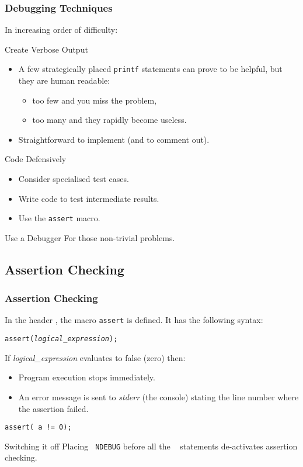 \documentclass[smaller,table]{beamer} %
\begin{document}
\begin{frame}
\frametitle{Debugging Techniques}
\begin{small}
In increasing order of difficulty:
\begin{block}{Create Verbose Output}
\begin{itemize}
\item A few strategically placed {\tt printf} statements can prove to be helpful, but they are human readable:
\begin{itemize}
\item too few and you miss the problem,
\item too many and they rapidly become useless.
\end{itemize}
\item Straightforward to implement (and to comment out).
\end{itemize}
\end{block}

\begin{block}{Code Defensively}
\begin{itemize}
\item Consider specialised test cases.
\item Write code to test intermediate results.
\item Use the {\tt assert} macro.
\end{itemize}
\end{block}

\begin{block}{Use a Debugger}
For those non-trivial problems.
\end{block}
\end{small}
\end{frame}

\subsection{Assertion Checking}
\begin{frame}
\frametitle{Assertion Checking}
In the header , the macro {\tt assert} is defined. It has the following syntax:\\
\begin{center}
\tt assert(\emph{logical\_expression});
\end{center}
If \emph{logical\_expression} evaluates to false (zero) then:
\begin{itemize}
\item Program execution stops immediately.
\item An error message is sent to \emph{stderr} (the console) stating the line number where the assertion failed.
\end{itemize} 
\begin{block}{}
{\tt assert( a != 0); }
\end{block}
\begin{exampleblock}{Switching it off}
Placing {\tt {} NDEBUG} before all the \mbox{\tt {} }
statements de-activates assertion checking.
\end{exampleblock}
\end{frame}
\end{document}
